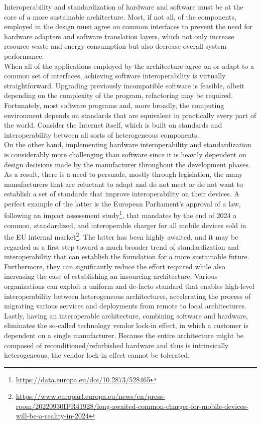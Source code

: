 Interoperability and standardization of hardware and software must be at the core
of a more sustainable architecture. Most, if not all, of the components, employed
in the design must agree on common interfaces to prevent the need for hardware adapters
and software translation layers, which not only increase resource waste and
energy consumption but also decrease overall system performance. \\ %
When all of the applications employed by the architecture agree on or adapt to a
common set of interfaces, achieving software interoperability is virtually straightforward.
Upgrading previously incompatible software is feasible, albeit depending on the complexity
of the program, refactoring may be required. Fortunately, most software programs
and, more broadly, the computing environment depends on standards that are
equivalent in practically every part of the world. Consider the Internet itself,
which is built on standards and interoperability between all sorts of
heterogeneous components. \\ %
On the other hand, implementing hardware interoperability and standardization is
considerably more challenging than software since it is heavily dependent on design
decisions made by the manufacturer throughout the development phases. As a
result, there is a need to persuade, mostly through legislation, the many manufacturers
that are reluctant to adapt and do not meet or do not want to establish a set of
standards that improve interoperability on their devices. A perfect example of
the latter is the European Parliament's approval of a law, following an impact assessment
study\footnote{\url{https://data.europa.eu/doi/10.2873/528465}}, that mandates
by the end of 2024 a common, standardized, and interoperable charger for all
mobile devices sold in the EU internal market\footnote{\url{https://www.europarl.europa.eu/news/en/press-room/20220930IPR41928/long-awaited-common-charger-for-mobile-devices-will-be-a-reality-in-2024}}.
The latter has been highly awaited, and it may be regarded as a first step
toward a much broader trend of standardization and interoperability that can
establish the foundation for a more sustainable future. \\ %
Furthermore, they can significantly reduce the effort required while also increasing
the ease of establishing an insourcing architecture. Various organizations can
exploit a uniform and de-facto standard that enables high-level interoperability
between heterogeneous architectures, accelerating the process of migrating various
services and deployments from remote to local architectures. \\ %
Lastly, having an interoperable architecture, combining software and hardware,
eliminates the so-called technology vendor lock-in effect, in which a customer is
dependent on a single manufacturer. Because the entire architecture might be
composed of reconditioned/refurbished hardware and thus is intrinsically
heterogeneous, the vendor lock-in effect cannot be tolerated.

